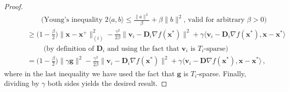 \documentclass{article}
\def\xx{{\boldsymbol x}}
\def\vv{{\boldsymbol v}}
\def\DD{{\boldsymbol D}}
\begin{document}
\begin{proof}
\begin{align}
    &\qquad\qquad \text{(Young's inequality ${2 \langle a, b \rangle \leq \frac{\|a\|^2}{\beta} + \beta \|b\|^2}$, valid for arbitrary $\beta > 0$)} \nonumber\\
    &\qquad\geq \Big(1 - \frac{\beta}{2}\Big)\|\xx - \xx^+\|_{(i)}^2 -  \frac{\gamma^2}{2\beta}\| \vv_i -  \DD_i \nabla f(\xx^*) \|^2 + \gamma\langle  \vv_i -  \DD_i \nabla f(\xx^*) , \xx - \xx^*\rangle \nonumber\\
    &\qquad\qquad \text{ (by definition of $\DD_i$ and using the fact that $\vv_i$ is $T_i$-sparse)}\nonumber\\
    &\qquad= \Big(1 - \frac{\beta}{2}\Big)\|\gamma \boldsymbol g\|^2 -  \frac{\gamma^2}{2\beta}\| \vv_i -  \DD_i \nabla f(\xx^*) \|^2 + \gamma\langle  \vv_i -  \DD \nabla f(\xx^*) , \xx - \xx^*\rangle \,,
\end{align}
  where in the last inequality we have used the fact that $\boldsymbol g$ is $T_i$-sparse.
Finally, dividing by $\gamma$ both sides yields the desired result.
\end{proof}
\end{document}
